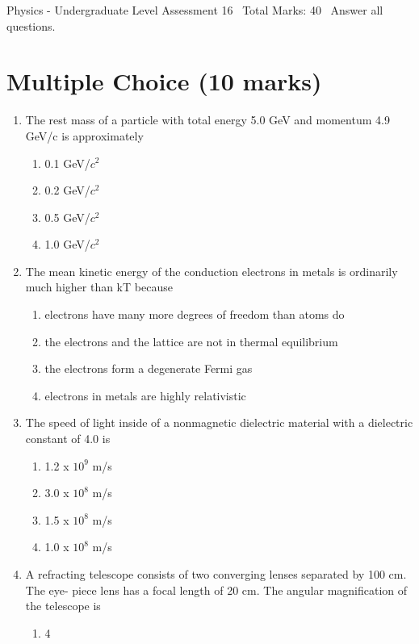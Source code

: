 \documentclass[12pt]{article}
\begin{document}
\begin{center}
Physics - Undergraduate Level Assessment 16 \
Total Marks: 40 \
Answer all questions.
\end{center}

\section*{Multiple Choice (10 marks)}
\begin{enumerate}[label=\arabic*.]
\item The rest mass of a particle with total energy 5.0 GeV and momentum 4.9 GeV/c is approximately
\begin{enumerate}[label=(\alph*)]
    \item 0.1 GeV/$c^2$
    \item 0.2 GeV/$c^2$
    \item 0.5 GeV/$c^2$
    \item 1.0 GeV/$c^2$
\end{enumerate}
\item The mean kinetic energy of the conduction electrons in metals is ordinarily much higher than kT because
\begin{enumerate}[label=(\alph*)]
    \item electrons have many more degrees of freedom than atoms do
    \item the electrons and the lattice are not in thermal equilibrium
    \item the electrons form a degenerate Fermi gas
    \item electrons in metals are highly relativistic
\end{enumerate}
\item The speed of light inside of a nonmagnetic dielectric material with a dielectric constant of 4.0 is
\begin{enumerate}[label=(\alph*)]
    \item 1.2 x $10^9$ m/s
    \item 3.0 x $10^8$ m/s
    \item 1.5 x $10^8$ m/s
    \item 1.0 x $10^8$ m/s
\end{enumerate}
\item A refracting telescope consists of two converging lenses separated by 100 cm. The eye- piece lens has a focal length of 20 cm. The angular magnification of the telescope is
\begin{enumerate}[label=(\alph*)]
    \item 4

\end{enumerate}
\end{enumerate}
\end{document}
